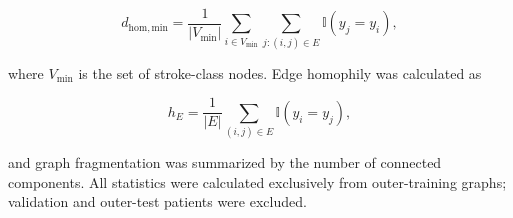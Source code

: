 \documentclass[pdflatex,sn-mathphys-num]{sn-jnl}%
\theoremstyle{thmstyleone}%
\theoremstyle{thmstyletwo}%
\theoremstyle{thmstylethree}%
\begin{document}
{ 
\begin{equation}
d_{\mathrm{hom,min}}
=
\frac{1}{|V_{\mathrm{min}}|}
\sum_{i\in V_{\mathrm{min}}}
\sum_{j:(i,j)\in E}
\mathbb{I}(y_j=y_i),
\label{eq:minority_homophilic_degree}
\end{equation}
}

 {
where \(V_{\mathrm{min}}\) is the set of stroke-class nodes. Edge homophily
was calculated as
}

{ 
\begin{equation}
h_E
=
\frac{1}{|E|}
\sum_{(i,j)\in E}
\mathbb{I}(y_i=y_j),
\label{eq:edge_homophily}
\end{equation}
}

 {
and graph fragmentation was summarized by the number of connected components.
All statistics were calculated exclusively from outer-training graphs;
validation and outer-test patients were excluded.
}
\end{document}
